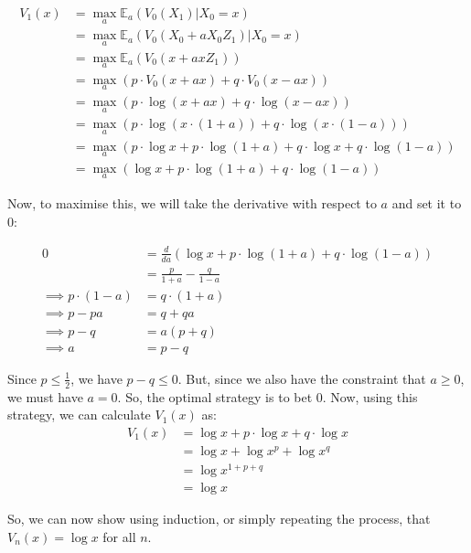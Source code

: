 \documentclass[a4paper]{article}
\begin{document}
\begin{align*}
    V_1(x) &= \max_a \mathbb{E}_a \left( V_0(X_1) | X_0 = x \right) \\
    &= \max_a \mathbb{E}_a \left( V_0(X_0 + aX_0Z_1) | X_0 = x \right) \\
    &= \max_a \mathbb{E}_a \left( V_0(x + axZ_1) \right) \\
    &= \max_a \left( p \cdot V_0(x + ax) + q \cdot V_0(x - ax) \right) \\
    &= \max_a \left( p \cdot \log(x + ax) + q \cdot \log(x - ax) \right) \\
    &= \max_a \left( p \cdot \log(x \cdot (1 + a)) + q \cdot \log(x \cdot (1 - a)) \right) \\
    &= \max_a \left( p \cdot \log x + p \cdot \log(1 + a) + q \cdot \log x + q \cdot \log(1 - a) \right) \\
    &= \max_a \left( \log x + p \cdot \log(1 + a) + q \cdot \log(1 - a) \right)
\end{align*}

\noindent Now, to maximise this, we will take the derivative with respect to $a$ and set it to $0$:

\begin{align*}
    0 &= \frac{d}{da} \left( \log x + p \cdot \log(1 + a) + q \cdot \log(1 - a) \right) \\
    &= \frac{p}{1 + a} - \frac{q}{1 - a} \\
    \implies p \cdot (1 - a) &= q \cdot (1 + a) \\
    \implies p - pa &= q + qa \\
    \implies p - q &= a(p + q) \\
    \implies a &= p - q
\end{align*}

\noindent Since $p \leq \frac{1}{2}$, we have $p - q \leq 0$. But, since we also have the constraint that $a \geq 0$, we must have $a = 0$. So, the optimal strategy is to bet $0$. Now, using this strategy, we can calculate $V_1(x)$ as:
\begin{align*}
    V_1(x) &= \log x + p \cdot \log x + q \cdot \log x \\
    &= \log x + \log x^p + \log x^q \\
    &= \log x^{1 + p + q} \\
    &= \log x
\end{align*}

\noindent So, we can now show using induction, or simply repeating the process, that $V_n(x) = \log x$ for all $n$.
\end{document}
